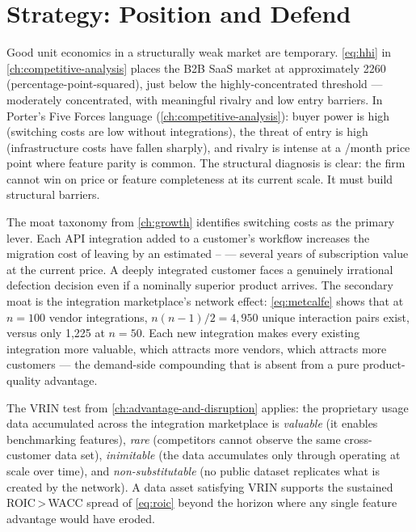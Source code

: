 \section{Strategy: Position and Defend}\label{sec:capstone-strategy}

Good unit economics in a structurally weak market are temporary. \cref{eq:hhi} in
\cref{ch:competitive-analysis} places the B2B SaaS market at approximately
\num{2260} (percentage-point-squared), just below the highly-concentrated threshold ---
moderately concentrated, with meaningful rivalry and low entry barriers. In Porter's
Five Forces language (\cref{ch:competitive-analysis}): buyer power is high (switching costs
are low without integrations), the threat of entry is high (infrastructure costs have
fallen sharply), and rivalry is intense at a /month price point where feature
parity is common. The structural diagnosis is clear: the firm cannot win on price or
feature completeness at its current scale. It must build structural barriers.

The moat taxonomy from \cref{ch:growth} identifies switching costs as the primary lever.
Each API integration added to a customer's workflow increases the migration cost of leaving
by an estimated -- --- several years of subscription value at
the current price. A deeply integrated customer faces a genuinely irrational defection
decision even if a nominally superior product arrives. The secondary moat is the integration
marketplace's network effect: \cref{eq:metcalfe} shows that at \(n=100\) vendor integrations,
\(n(n-1)/2 = 4{,}950\) unique interaction pairs exist, versus only 1,225 at \(n=50\). Each
new integration makes every existing integration more valuable, which attracts more vendors,
which attracts more customers --- the demand-side compounding that is absent from a pure
product-quality advantage.

The VRIN test from \cref{ch:advantage-and-disruption} applies: the proprietary usage data
accumulated across the integration marketplace is \emph{valuable} (it enables benchmarking
features), \emph{rare} (competitors cannot observe the same cross-customer data set),
\emph{inimitable} (the data accumulates only through operating at scale over time), and
\emph{non-substitutable} (no public dataset replicates what is created by the network).
A data asset satisfying VRIN supports the sustained ROIC\,>\,WACC spread of \cref{eq:roic}
beyond the horizon where any single feature advantage would have eroded.

